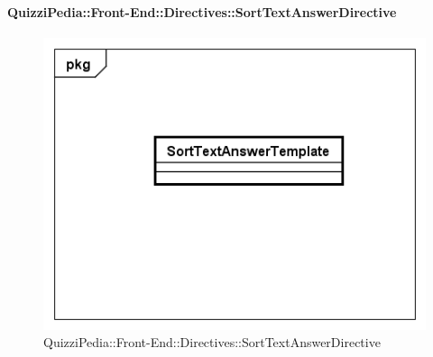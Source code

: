 		\paragraph{QuizziPedia::Front-End::Directives::SortTextAnswerDirective}
		
		\label{QuizziPedia::Front-End::Directives::SortTextAnswerDirective}
		
		\begin{figure}[ht]
			\centering
			\includegraphics[scale=0.5,keepaspectratio]{UML/Classi/Front-End/QuizziPedia_Front-end_Templates_SortTextAnswerTemplate.png}
			\caption{QuizziPedia::Front-End::Directives::SortTextAnswerDirective}
		\end{figure} \FloatBarrier
		
